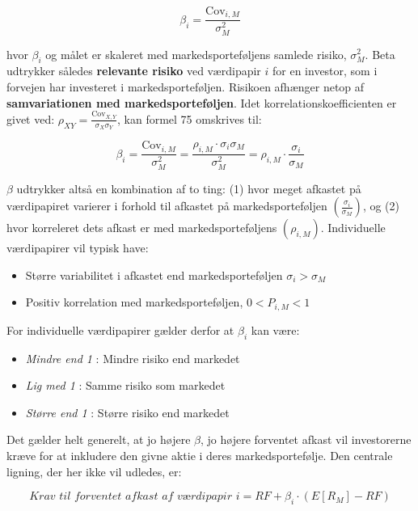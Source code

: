 \documentclass[10pt,reqno, usenames]{article}
\begin{document}
\begin{equation}
    \beta_i = \frac{\text{Cov}_{i,M}}{\sigma_M^2}
\end{equation}

hvor $\beta_i$ og målet er skaleret med markedsporteføljens samlede risiko, 
$\sigma_M^2$. Beta udtrykker således \textbf{relevante risiko} ved værdipapir $i$ for en investor, som i forvejen har investeret i markedsporteføljen. Risikoen afhænger netop af \textbf{samvariationen med markedsporteføljen}. Idet korrelationskoefficienten er givet ved: $\rho_{XY} = \frac{\text{Cov}_{X,Y}}{\sigma_X \sigma_Y}$, kan formel 75 omskrives til: 

   \begin{equation}
        \beta_i = \frac{\text{Cov}_{i,M}}{\sigma_M^2} = \frac{\rho_{i,M} \cdot \sigma_i \sigma_M}{\sigma_M^2} = \rho_{i,M} \cdot \frac{\sigma_i}{\sigma_M}
    \end{equation}

$\beta$ udtrykker altså en kombination af to ting: (1) hvor meget afkastet på værdipapiret varierer i forhold til afkastet på markedsporteføljen \(\left( \frac{\sigma_i}{\sigma_M} \right)\), og (2) hvor korreleret dets afkast er med markedsporteføljens \(\left( \rho_{i,M} \right)\). Individuelle værdipapirer vil typisk have: 

\begin{itemize}
    \item Større variabilitet i afkastet end markedsporteføljen $\sigma_i > \sigma_M$
    \item Positiv korrelation med markedsporteføljen, $0<P_{i,M}<1$
\end{itemize}

For individuelle værdipapirer gælder derfor at \( \beta_i \) kan være:
\begin{itemize}
        \item \textit{Mindre end 1} : Mindre risiko end markedet
        \item \textit{Lig med 1} : Samme risiko som markedet
        \item \textit{Større end 1} : Større risiko end markedet
\end{itemize}

Det gælder helt generelt, at jo højere $\beta$, jo højere forventet afkast vil investorerne kræve for at inkludere den givne aktie i deres markedsportefølje. Den centrale ligning, der her ikke vil udledes, er: 

\begin{equation}
    \textit{Krav til forventet afkast af værdipapir i} = RF + \beta_i \cdot (E[R_M] - RF)
\end{equation}
\end{document}
